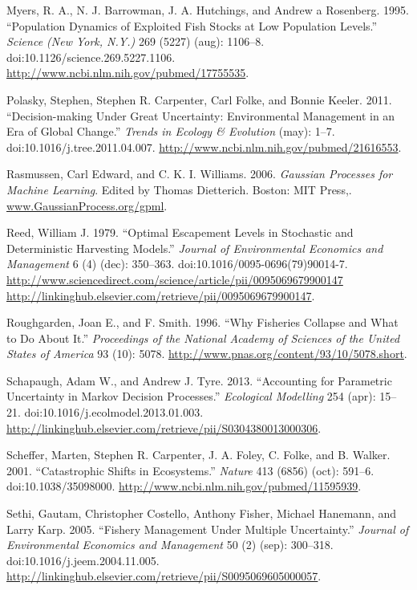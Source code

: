 \documentclass[author-year, review]{elsarticle} %
\begin{document}
Myers, R. A., N. J. Barrowman, J. A. Hutchings, and Andrew a Rosenberg.
1995. ``Population Dynamics of Exploited Fish Stocks at Low Population
Levels.'' \emph{Science (New York, N.Y.)} 269 (5227) (aug): 1106--8.
doi:10.1126/science.269.5227.1106.
\url{http://www.ncbi.nlm.nih.gov/pubmed/17755535}.

Polasky, Stephen, Stephen R. Carpenter, Carl Folke, and Bonnie Keeler.
2011. ``Decision-making Under Great Uncertainty: Environmental
Management in an Era of Global Change.'' \emph{Trends in Ecology \&
Evolution} (may): 1--7. doi:10.1016/j.tree.2011.04.007.
\url{http://www.ncbi.nlm.nih.gov/pubmed/21616553}.

Rasmussen, Carl Edward, and C. K. I. Williams. 2006. \emph{Gaussian
Processes for Machine Learning}. Edited by Thomas Dietterich. Boston:
MIT Press,. \url{www.GaussianProcess.org/gpml}.

Reed, William J. 1979. ``Optimal Escapement Levels in Stochastic and
Deterministic Harvesting Models.'' \emph{Journal of Environmental
Economics and Management} 6 (4) (dec): 350--363.
doi:10.1016/0095-0696(79)90014-7.
\href{http://www.sciencedirect.com/science/article/pii/0095069679900147 http://linkinghub.elsevier.com/retrieve/pii/0095069679900147}{http://www.sciencedirect.com/science/article/pii/0095069679900147
http://linkinghub.elsevier.com/retrieve/pii/0095069679900147}.

Roughgarden, Joan E., and F. Smith. 1996. ``Why Fisheries Collapse and
What to Do About It.'' \emph{Proceedings of the National Academy of
Sciences of the United States of America} 93 (10): 5078.
\url{http://www.pnas.org/content/93/10/5078.short}.

Schapaugh, Adam W., and Andrew J. Tyre. 2013. ``Accounting for
Parametric Uncertainty in Markov Decision Processes.'' \emph{Ecological
Modelling} 254 (apr): 15--21. doi:10.1016/j.ecolmodel.2013.01.003.
\url{http://linkinghub.elsevier.com/retrieve/pii/S0304380013000306}.

Scheffer, Marten, Stephen R. Carpenter, J. A. Foley, C. Folke, and B.
Walker. 2001. ``Catastrophic Shifts in Ecosystems.'' \emph{Nature} 413
(6856) (oct): 591--6. doi:10.1038/35098000.
\url{http://www.ncbi.nlm.nih.gov/pubmed/11595939}.

Sethi, Gautam, Christopher Costello, Anthony Fisher, Michael Hanemann,
and Larry Karp. 2005. ``Fishery Management Under Multiple Uncertainty.''
\emph{Journal of Environmental Economics and Management} 50 (2) (sep):
300--318. doi:10.1016/j.jeem.2004.11.005.
\url{http://linkinghub.elsevier.com/retrieve/pii/S0095069605000057}.
\end{document}
